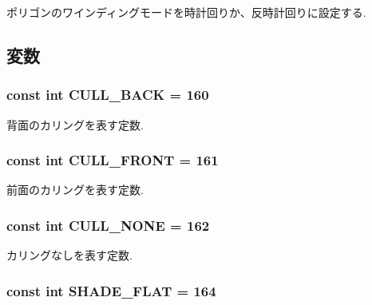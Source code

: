 ポリゴンのワインディングモードを時計回りか、反時計回りに設定する. 

\subsection{変数}
\hypertarget{classm3g_1_1PolygonMode_34ae9162b765ddbc1d2476edf3195361}{
\subsubsection[{CULL\_\-BACK}]{\setlength{\rightskip}{0pt plus 5cm}const int {\bf CULL\_\-BACK} = 160}}
\label{classm3g_1_1PolygonMode_34ae9162b765ddbc1d2476edf3195361}


背面のカリングを表す定数. \hypertarget{classm3g_1_1PolygonMode_efa180528b010979c6f7732c3c3114ae}{
\subsubsection[{CULL\_\-FRONT}]{\setlength{\rightskip}{0pt plus 5cm}const int {\bf CULL\_\-FRONT} = 161}}
\label{classm3g_1_1PolygonMode_efa180528b010979c6f7732c3c3114ae}


前面のカリングを表す定数. \hypertarget{classm3g_1_1PolygonMode_48717ad405f481d0f2ab8e948bf86822}{
\subsubsection[{CULL\_\-NONE}]{\setlength{\rightskip}{0pt plus 5cm}const int {\bf CULL\_\-NONE} = 162}}
\label{classm3g_1_1PolygonMode_48717ad405f481d0f2ab8e948bf86822}


カリングなしを表す定数. \hypertarget{classm3g_1_1PolygonMode_5da32249eba3f6eb4366f016c424099e}{
\subsubsection[{SHADE\_\-FLAT}]{\setlength{\rightskip}{0pt plus 5cm}const int {\bf SHADE\_\-FLAT} = 164}}
\label{classm3g_1_1PolygonMode_5da32249eba3f6eb4366f016c424099e}


